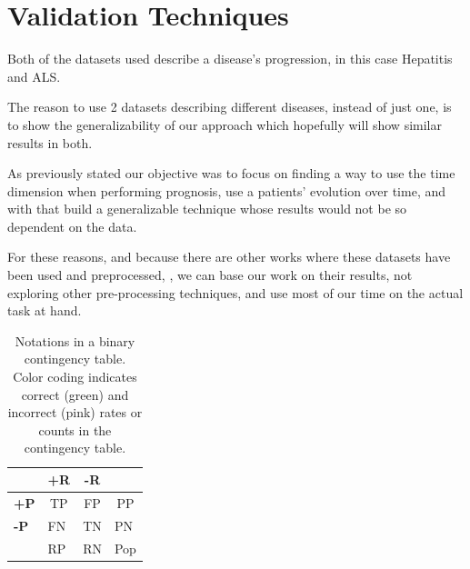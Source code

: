  \section{Validation Techniques}
\label{section:validation}

Both of the datasets used describe a disease’s progression, in this case Hepatitis and ALS. 

The reason to use 2 datasets describing different diseases, instead of just one, is to show the generalizability of our approach which hopefully
will show similar results in both.

As previously stated our objective was to focus on finding a way to use the time dimension when performing prognosis, use a patients’ evolution over time, and with that build a generalizable technique whose results would not be so dependent on the data.

For these reasons, and because there are other works where these datasets have been used and preprocessed, \cite{Watanabe2003}, we can base our work on their results, not exploring other pre-processing techniques, and use most of our time on the actual task at hand.

\begin{table}[h]
		\begin{center}
	\begin{tabular}{l|lll}
		\multicolumn{1}{c|}{\textbf{}}   & \multicolumn{1}{c}{\textbf{+R}}                & \multicolumn{1}{c}{\textbf{-R}}                & \multicolumn{1}{c}{\textbf{}} \\ \hline
		\multicolumn{1}{c|}{\textbf{+P}} & \multicolumn{1}{c}{\cellcolor[HTML]{9AFF99}TP} & \multicolumn{1}{c}{\cellcolor[HTML]{FFCCC9}FP} & \multicolumn{1}{c}{PP}        \\
		\textbf{-P}                      & \cellcolor[HTML]{FFCCC9}FN                     & \cellcolor[HTML]{9AFF99}TN                     & PN                            \\
		& RP                                             & RN                                             & Pop                            
	\end{tabular}
		\caption{Notations in a binary contingency table. Color coding indicates correct (green) and incorrect (pink) rates or counts in the contingency table.}
		\label{tab:notation}
	\end{center}
\end{table}

